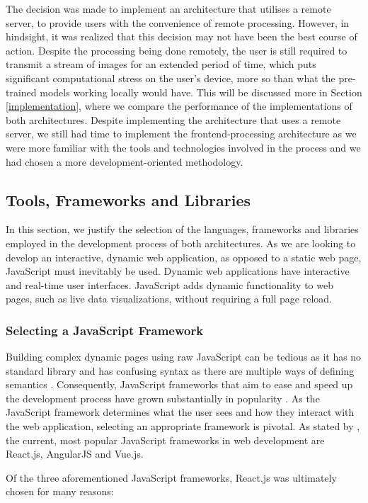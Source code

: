 \documentclass[12pt, a4paper]{article}
\newcommand{\np}
    {
    \vskip 0.4cm
    }
\begin{document}
\np
The decision was made to implement an architecture that utilises a remote server, to provide users with the convenience of remote processing. However, in hindsight, it was realized that this decision may not have been the best course of action. Despite the processing being done remotely, the user is still required to transmit a stream of images for an extended period of time, which puts significant computational stress on the user's device, more so than what the pre-trained models working locally would have. This will be discussed more in Section \ref{implementation}, where we compare the performance of the implementations of both architectures. Despite implementing the architecture that uses a remote server, we still had time to implement the frontend-processing architecture as we were more familiar with the tools and technologies involved in the process and we had chosen a more development-oriented methodology.

\subsection{Tools, Frameworks and Libraries}
\label{tfl}

In this section, we justify the selection of the languages, frameworks and libraries employed in the development process of both architectures. As we are looking to develop an interactive, dynamic web application, as opposed to a static web page, JavaScript must inevitably be used. Dynamic web applications have interactive and real-time user interfaces. JavaScript adds dynamic functionality to web pages, such as live data visualizations, without requiring a full page reload. 

\subsubsection{Selecting a JavaScript Framework}

Building complex dynamic pages using raw JavaScript can be tedious as it has no standard library and has confusing syntax as there are multiple ways of defining semantics \citep{jsbad}. Consequently, JavaScript frameworks that aim to ease and speed up the development process have grown substantially in popularity \citep{delcev2018modern}. As the JavaScript framework determines what the user sees and how they interact with the web application, selecting an appropriate framework is pivotal. As stated by \cite{saks2019javascript}, the current, most popular JavaScript frameworks in web development are React.js, AngularJS and Vue.js.
\np
Of the three aforementioned JavaScript frameworks, React.js was ultimately chosen for many reasons:
\end{document}

